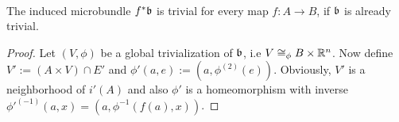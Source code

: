  \\
The induced microbundle $f^*\mathfrak{b}$ is trivial for every map $f: A \to B$, if $\mathfrak{b}$ is already trivial.
\begin{proof}
Let $(V, \phi)$ be a global trivialization of $\mathfrak{b}$, i.e $V \cong_\phi B \times \mathbb{R}^n$.
Now define $V' := (A \times V) \cap E'$ and $\phi'(a, e) := (a, \phi^{(2)}(e))$.
Obviously, $V'$ is a neighborhood of $i'(A)$ and also $\phi'$ is a homeomorphism with inverse $\phi'^{(-1)}(a, x) = (a, \phi^{-1}(f(a), x))$.
\end{proof}